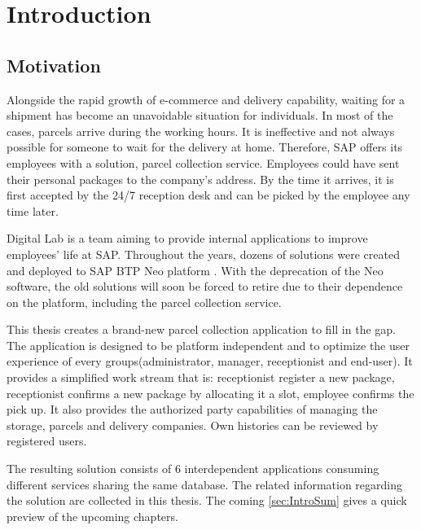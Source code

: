 \chapter{Introduction}
\label{ch:intro}

\section{Motivation}
Alongside the rapid growth of e-commerce and delivery capability, waiting for a shipment has become an unavoidable situation for individuals. In most of the cases, parcels arrive during the working hours. It is ineffective and not always possible for someone to wait for the delivery at home. Therefore, SAP \cite{sap} offers its employees with a solution, parcel collection service. Employees could have sent their personal packages to the company's address. By the time it arrives, it is first accepted by the 24/7 reception desk and can be picked by the employee any time later.

Digital Lab is a team aiming to provide internal applications to improve employees' life at SAP. Throughout the years, dozens of solutions were created and deployed to SAP BTP \cite{btp} Neo platform \cite{neo}. With the deprecation of the Neo software, the old solutions will soon be forced to retire due to their dependence on the platform, including the parcel collection service.

This thesis creates a brand-new parcel collection application to fill in the gap. The application is designed to be platform independent and to optimize the user experience of every groups(administrator, manager, receptionist and end-user). It provides a simplified work stream that is: receptionist register a new package, receptionist confirms a new package by allocating it a slot, employee confirms the pick up. It also provides the authorized party capabilities of managing the storage, parcels and delivery companies. Own histories can be reviewed by registered users.

The resulting solution consists of 6 interdependent applications consuming different services sharing the same database. The related information regarding the solution are collected in this thesis. The coming \autoref{sec:IntroSum} gives a quick preview of the upcoming chapters.


